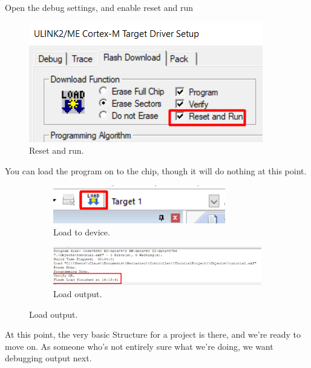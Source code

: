 \documentclass{article}
\begin{document}
Open the debug settings, and enable reset and run
\begin{figure}[H]
    \centering
    \includegraphics[width=0.5\linewidth]{pics/ResetAndRun.png}
    \caption{Reset and run.}
    \label{fig:ResetAndRun}
\end{figure}

You can load the program on to the chip, though it will do nothing at this point.
\begin{figure}[H]
    \centering
    \begin{subfigure}[b]{0.3\linewidth}
        \includegraphics[width=\linewidth]{pics/load.png}
        \caption{Load to device.}
    \end{subfigure}
    \begin{subfigure}[b]{0.6\linewidth}
        \includegraphics[width=\linewidth]{pics/loadOk.png}
        \caption{Load output.}
    \end{subfigure}
    \label{fig:BasicLoad}
\end{figure}

At this point, the very basic Structure for a project is there, and we're ready
to move on. As someone who's not entirely sure what we're doing, we want debugging output next.

\newpage
\end{document}
